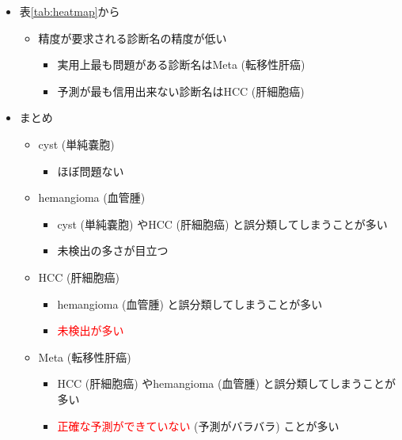\documentclass[a4j]{ujarticle}
\newcommand{\Tref}[1]{\mbox{表\ref{tab:#1}}}
\begin{document}
\begin{itemize}
\begin{itemize}
                \item \Tref{heatmap}から
                \begin{itemize}
                    \item 精度が要求される診断名の精度が低い
                    \begin{itemize}
                        \item 実用上最も問題がある診断名はMeta (転移性肝癌)
                        \item 予測が最も信用出来ない診断名はHCC (肝細胞癌)
                    \end{itemize}
                \end{itemize}
                \item まとめ
                \begin{itemize}
                    \item cyst (単純嚢胞)
                    \begin{itemize}
                        \item ほぼ問題ない
                    \end{itemize}
                    \item hemangioma (血管腫)
                    \begin{itemize}
                        \item cyst (単純嚢胞) やHCC (肝細胞癌) と誤分類してしまうことが多い
                        \item 未検出の多さが目立つ
                    \end{itemize}
                    \item HCC (肝細胞癌)
                    \begin{itemize}
                        \item hemangioma (血管腫) と誤分類してしまうことが多い
                        \item \textcolor{red}{未検出が多い}
                    \end{itemize}
                    \item Meta (転移性肝癌)
                    \begin{itemize}
                        \item HCC (肝細胞癌) やhemangioma (血管腫) と誤分類してしまうことが多い
                        \item \textcolor{red}{正確な予測ができていない} (予測がバラバラ) ことが多い
                    \end{itemize}
                \end{itemize}
            \end{itemize}


\end{itemize}
\end{document}
